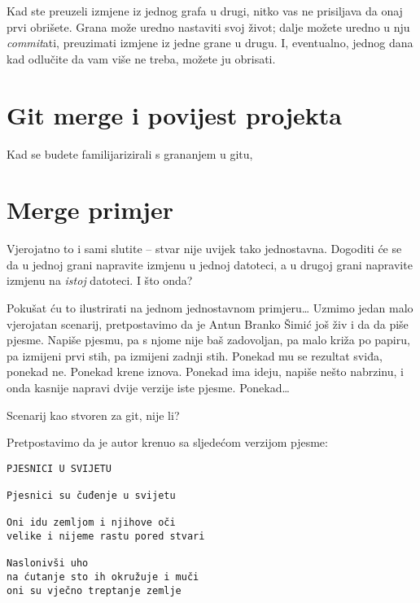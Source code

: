 

Kad ste preuzeli izmjene iz jednog grafa u drugi, nitko vas ne prisiljava da onaj prvi obrišete. 
Grana može uredno nastaviti svoj život; dalje možete uredno u nju \emph{commit}ati, preuzimati izmjene iz jedne grane u drugu.
I, eventualno, jednog dana kad odlučite da vam više ne treba, možete ju obrisati.



\section*{Git merge i povijest projekta}

Kad se budete familijarizirali s grananjem u gitu, 



\section*{Merge primjer}

Vjerojatno to i sami slutite -- stvar nije uvijek tako jednostavna.
Dogoditi će se da u jednoj grani napravite izmjenu u jednoj datoteci, a u drugoj grani napravite izmjenu na \emph{istoj} datoteci.
I što onda?

Pokušat ću to ilustrirati na jednom jednostavnom primjeru\dots
Uzmimo jedan malo vjerojatan scenarij, pretpostavimo da je Antun Branko Šimić još živ i da da piše pjesme.
Napiše pjesmu, pa s njome nije baš zadovoljan, pa malo križa po papiru, pa izmijeni prvi stih, pa izmijeni zadnji stih.
Ponekad mu se rezultat sviđa, ponekad ne.
Ponekad krene iznova.
Ponekad ima ideju, napiše nešto nabrzinu, i onda kasnije napravi dvije verzije iste pjesme.
Ponekad\dots

Scenarij kao stvoren za git, nije li?

Pretpostavimo da je autor krenuo sa sljedećom verzijom pjesme:

\begin{verbatim}
PJESNICI U SVIJETU

Pjesnici su čuđenje u svijetu

Oni idu zemljom i njihove oči
velike i nijeme rastu pored stvari

Naslonivši uho
na ćutanje sto ih okružuje i muči
oni su vječno treptanje zemlje
\end{verbatim}

